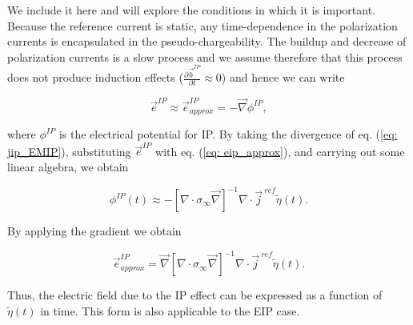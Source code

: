\documentclass[extra,mreferee]{gji}
\renewcommand{\div}{\nabla\cdot}
\newcommand{\grad}{\vec \nabla}
\newcommand{\siginf}{\sigma_\infty}
\renewcommand {\j}  { {\vec j} }
\renewcommand {\b}  { {\vec b} }
\newcommand {\e}  { {\vec e} }
\newcommand{\peta}{\tilde{\eta}}
\newcommand{\jref}{\j^{\ ref}}
\begin{document}
We include it here and will explore the conditions in which it is important. 
Because the reference current is static, any time-dependence in the polarization currents is encapsulated in the pseudo-chargeability. The buildup and decrease of polarization currents is a slow process and we assume therefore that this process does not produce induction effects ($\frac{\partial \b^{IP}}{\partial t} \approx 0$) and hence we can write 
\begin{linenomath*}
\begin{equation}
  \e^{IP} \approx  \e^{IP}_{approx} = -\grad\phi^{IP}, 
  \label{eq: eip_approx}
\end{equation}
\end{linenomath*}
where $\phi^{IP}$ is the electrical potential for IP. 
By taking the divergence of  eq. (\ref{eq: jip_EMIP}), substituting  $\e^{IP}$ with eq. (\ref{eq: eip_approx}), and carrying out some linear algebra, we obtain
\begin{linenomath*}
\begin{equation}
  \phi^{IP}(t) \approx -[\div \siginf\grad]^{-1}\div\jref\peta(t).
  \label{eq: phiIPapprox_general}
\end{equation}
\end{linenomath*}
By applying the gradient we obtain 
\begin{linenomath*}
\begin{equation}
    \e^{IP}_{approx} = \grad[\div \siginf\grad]^{-1}\div\jref\peta(t).
    \label{eq: eip_approx_full}
\end{equation}
\end{linenomath*}
Thus, the electric field due to the IP effect can be expressed as a function of $\peta(t)$ in time. 
This form is also applicable to the  EIP case.   
\end{document}
